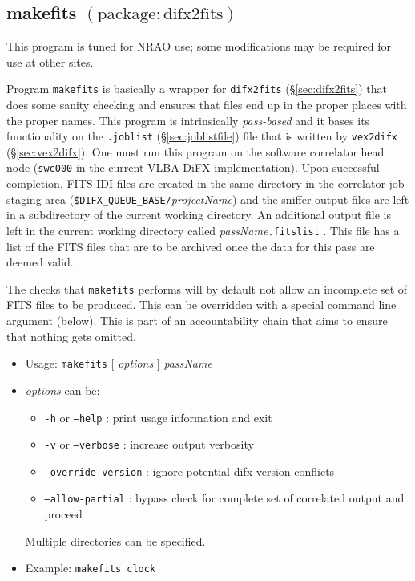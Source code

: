 
\subsection{makefits {\small $\mathrm{(package: difx2fits)}$}} \label{sec:makefits}

This program is tuned for NRAO use; some modifications may be required for use at other sites.

Program {\tt makefits} is basically a wrapper for {\tt difx2fits} (\S\ref{sec:difx2fits}) that does some sanity checking and ensures that files end up in the proper places with the proper names.
This program is intrinsically {\em pass-based} and it bases its functionality on the {\tt .joblist} (\S\ref{sec:joblistfile}) file that is written by {\tt vex2difx} (\S\ref{sec:vex2difx}).
One must run this program on the software correlator head node ({\tt swc000} in the current VLBA DiFX implementation).
Upon successful completion, FITS-IDI files are created in the same directory in the correlator job staging area ({\tt \$DIFX\_QUEUE\_BASE/}{\em projectName}) and the sniffer output files are left in a subdirectory of the current working directory.
An additional output file is left in the current working directory called {\em passName}{\tt .fitslist} .
This file has a list of the FITS files that are to be archived once the data for this pass are deemed valid.

The checks that {\tt makefits} performs will by default not allow an incomplete set of FITS files to be produced.
This can be overridden with a special command line argument (below).
This is part of an accountability chain that aims to ensure that nothing gets omitted.

\begin{itemize}
\item[] Usage: {\tt makefits} $[$ {\em options} $]$ {\em passName}
\item[] {\em options} can be:
\begin{itemize}
\item[] {\tt -h} or {\tt --help} : print usage information and exit
\item[] {\tt -v} or {\tt --verbose} : increase output verbosity
\item[] {\tt --override-version} : ignore potential difx version conflicts
\item[] {\tt --allow-partial} : bypass check for complete set of correlated output and proceed
\end{itemize}
Multiple directories can be specified.
\item[] Example: {\tt makefits clock}
\end{itemize}







